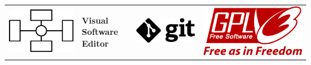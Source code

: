 \documentclass[11pt]{article}
\newlength{\picw}
\begin{document}
	\clearpage
	\thispagestyle{empty}

	\hspace{-4.0cm}
	{
		\begin{tabular}{MMMM}
			\includegraphics[width=\picw]{logo} &
			\LARGE{\textbf{Visual Software Editor}} &
			\includegraphics[width=\picw]{git_logo_black} &
			\includegraphics[width=\picw]{gplv3_logo_red}
		\end{tabular}
	}
\end{document}
